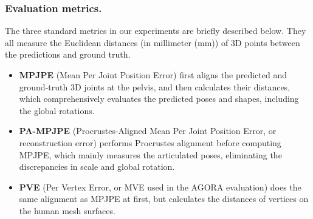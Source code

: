 \documentclass[runningheads]{llncs}
\begin{document}
\subsubsection{Evaluation metrics.}
The three standard metrics in our experiments are briefly described below.
They all measure the Euclidean distances (in millimeter (mm)) of 3D points between the predictions and ground truth.
\begin{itemize}
	\item [] \textbf{MPJPE}
	(Mean Per Joint Position Error) first aligns the predicted and ground-truth 3D joints at the pelvis, and then calculates their distances, which comprehensively evaluates the predicted poses and shapes, including the global rotations.
	\item [] \textbf{PA-MPJPE}
	(Procrustes-Aligned Mean Per Joint Position Error, or reconstruction error) performs Procrustes alignment before computing MPJPE, which mainly measures the articulated poses, eliminating the discrepancies in scale and global rotation.
	\item [] \textbf{PVE}
	(Per Vertex Error, or MVE used in the AGORA evaluation) does the same alignment as MPJPE at first, but calculates the distances of vertices on the human mesh surfaces.
\end{itemize}
\end{document}
